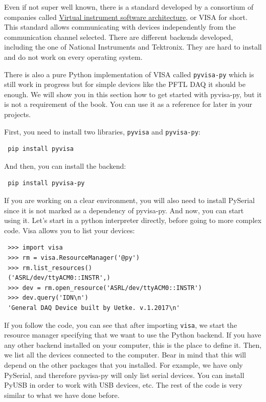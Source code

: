 Even if not super well known, there is a standard developed by a consortium of companies called \href{https://en.wikipedia.org/wiki/Virtual_instrument_software_architecture}{Virtual instrument software architecture}, or VISA for short. This standard allows communicating with devices independently from the communication channel selected. There are different backends developed, including the one of National Instruments and Tektronix. They are hard to install and do not work on every operating system. 

There is also a pure Python implementation of VISA called \texttt{pyvisa-py} which is still work in progress but for simple devices like the {PFTL DAQ} it should be enough. We will show you in this section how to get started with pyvisa-py, but it is not a requirement of the book. You can use it as a reference for later in your projects. 

First, you need to install two libraries, \texttt{pyvisa} and \texttt{pyvisa-py}:

\begin{verbatim}
 pip install pyvisa
\end{verbatim}

And then, you can install the backend:

\begin{verbatim}
 pip install pyvisa-py
\end{verbatim}

If you are working on a clear environment, you will also need to install PySerial since it is not marked as a dependency of pyvisa-py. And now, you can start using it. Let's start in a python interpreter directly, before going to more complex code. Visa allows you to list your devices:

\begin{verbatim}
 >>> import visa
 >>> rm = visa.ResourceManager('@py')
 >>> rm.list_resources()
 ('ASRL/dev/ttyACM0::INSTR',)
 >>> dev = rm.open_resource('ASRL/dev/ttyACM0::INSTR')
 >>> dev.query('IDN\n')
 'General DAQ Device built by Uetke. v.1.2017\n'
\end{verbatim}

If you follow the code, you can see that after importing \texttt{visa}, we start the resource manager specifying that we want to use the Python backend. If you have any other backend installed on your computer, this is the place to define it. Then, we list all the devices connected to the computer. Bear in mind that this will depend on the other packages that you installed. For example, we have only PySerial, and therefore pyvisa-py will only list serial devices. You can install PyUSB in order to work with USB devices, etc. The rest of the code is very similar to what we have done before.

